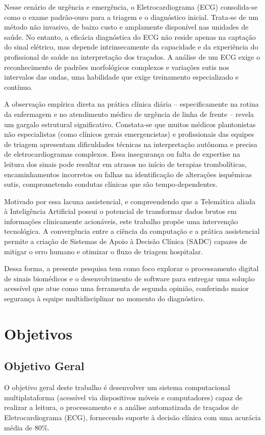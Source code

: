 \documentclass[portuguese,12pt,oneside,a4paper]{book}
\begin{document}
Nesse cenário de urgência e emergência, o Eletrocardiograma (ECG) consolida-se como o exame padrão-ouro para a triagem e o diagnóstico inicial. Trata-se de um método não invasivo, de baixo custo e amplamente disponível nas unidades de saúde. No entanto, a eficácia diagnóstica do ECG não reside apenas na captação do sinal elétrico, mas depende intrinsecamente da capacidade e da experiência do profissional de saúde na interpretação dos traçados. A análise de um ECG exige o reconhecimento de padrões morfológicos complexos e variações sutis nos intervalos das ondas, uma habilidade que exige treinamento especializado e contínuo.

A observação empírica direta na prática clínica diária – especificamente na rotina da enfermagem e no atendimento médico de urgência de linha de frente – revela um gargalo estrutural significativo. Constata-se que muitos médicos plantonistas não especialistas (como clínicos gerais emergencistas) e profissionais das equipes de triagem apresentam dificuldades técnicas na interpretação autônoma e precisa de eletrocardiogramas complexos. Essa insegurança ou falta de expertise na leitura dos sinais pode resultar em atrasos no início de terapias trombolíticas, encaminhamentos incorretos ou falhas na identificação de alterações isquêmicas sutis, comprometendo condutas clínicas que são tempo-dependentes.

Motivado por essa lacuna assistencial, e compreendendo que a Telemática aliada à Inteligência Artificial possui o potencial de transformar dados brutos em informações clinicamente acionáveis, este trabalho propõe uma intervenção tecnológica. A convergência entre a ciência da computação e a prática assistencial permite a criação de Sistemas de Apoio à Decisão Clínica (SADC) capazes de mitigar o erro humano e otimizar o fluxo de triagem hospitalar. 

Dessa forma, a presente pesquisa tem como foco explorar o processamento digital de sinais biomédicos e o desenvolvimento de software para entregar uma solução acessível que atue como uma ferramenta de segunda opinião, conferindo maior segurança à equipe multidisciplinar no momento do diagnóstico.

\section{Objetivos}

\subsection{Objetivo Geral}
O objetivo geral deste trabalho é desenvolver um sistema computacional multiplataforma (acessível via dispositivos móveis e computadores) capaz de realizar a leitura, o processamento e a análise automatizada de traçados de Eletrocardiograma (ECG), fornecendo suporte à decisão clínica com uma acurácia média de 80\%.
\end{document}

